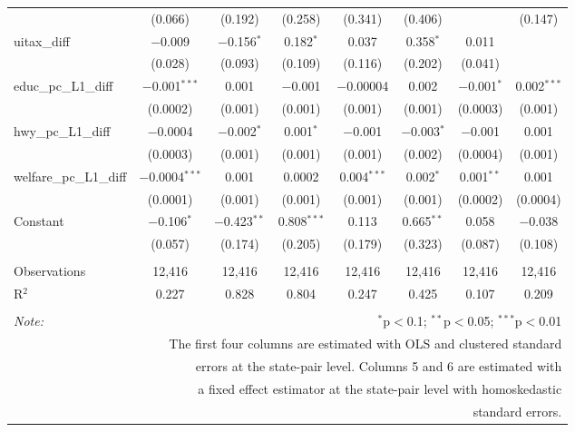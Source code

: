 \begin{table}[!htbp]
\begin{tabular}{@{\extracolsep{5pt}}lccccccc}
  & (0.066) & (0.192) & (0.258) & (0.341) & (0.406) &  & (0.147) \\ 
  uitax\_diff & $-$0.009 & $-$0.156$^{*}$ & 0.182$^{*}$ & 0.037 & 0.358$^{*}$ & 0.011 &  \\ 
  & (0.028) & (0.093) & (0.109) & (0.116) & (0.202) & (0.041) &  \\ 
  educ\_pc\_L1\_diff & $-$0.001$^{***}$ & 0.001 & $-$0.001 & $-$0.00004 & 0.002 & $-$0.001$^{*}$ & 0.002$^{***}$ \\ 
  & (0.0002) & (0.001) & (0.001) & (0.001) & (0.001) & (0.0003) & (0.001) \\ 
  hwy\_pc\_L1\_diff & $-$0.0004 & $-$0.002$^{*}$ & 0.001$^{*}$ & $-$0.001 & $-$0.003$^{*}$ & $-$0.001 & 0.001 \\ 
  & (0.0003) & (0.001) & (0.001) & (0.001) & (0.002) & (0.0004) & (0.001) \\ 
  welfare\_pc\_L1\_diff & $-$0.0004$^{***}$ & 0.001 & 0.0002 & 0.004$^{***}$ & 0.002$^{*}$ & 0.001$^{**}$ & 0.001 \\ 
  & (0.0001) & (0.001) & (0.001) & (0.001) & (0.001) & (0.0002) & (0.0004) \\ 
  Constant & $-$0.106$^{*}$ & $-$0.423$^{**}$ & 0.808$^{***}$ & 0.113 & 0.665$^{**}$ & 0.058 & $-$0.038 \\ 
  & (0.057) & (0.174) & (0.205) & (0.179) & (0.323) & (0.087) & (0.108) \\ 
 \hline \\[-1.8ex] 
Observations & 12,416 & 12,416 & 12,416 & 12,416 & 12,416 & 12,416 & 12,416 \\ 
R$^{2}$ & 0.227 & 0.828 & 0.804 & 0.247 & 0.425 & 0.107 & 0.209 \\ 
\hline 
\hline \\[-1.8ex] 
\textit{Note:}  & \multicolumn{7}{r}{$^{*}$p$<$0.1; $^{**}$p$<$0.05; $^{***}$p$<$0.01} \\ 
 & \multicolumn{7}{r}{The first four columns are estimated with OLS and clustered standard} \\ 
 & \multicolumn{7}{r}{ errors at the state-pair level. Columns 5 and 6 are estimated with} \\ 
 & \multicolumn{7}{r}{a fixed effect estimator at the state-pair level with homoskedastic} \\ 
 & \multicolumn{7}{r}{standard errors.} \\ 
\end{tabular} 
\end{table} 
